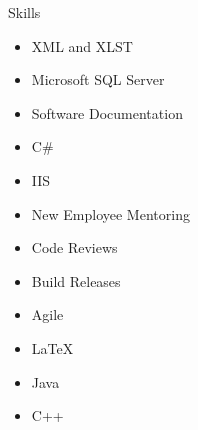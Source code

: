 \documentclass{resume} %
\begin{document}



\begin{rSection}{Skills}
\begin{multicols}{3}
\begin{enumerate}
\begin{itemize}
\item XML and XLST
\item Microsoft SQL Server
\item Software Documentation
\item C\# 
\item IIS
\item New Employee Mentoring
\item Code Reviews
\item Build Releases
\item Agile
\item LaTeX
\item Java
\item C++
\end{itemize}
\end{enumerate}
\end{multicols}
\end{rSection}

\end{document}
